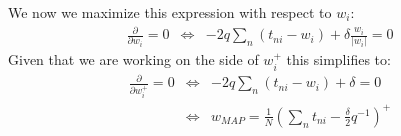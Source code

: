 \documentclass[a4paper, 11pt]{article}
\begin{document}
We now we maximize this expression with respect to $w_i$:
\begin{eqnarray}
\frac{\partial}{\partial w_{i}} = 0 &\Leftrightarrow& -2 q \sum_{n} (t_{ni} - w_{i}) + \delta \frac{w_i}{|w_i|} = 0 \nonumber
\end{eqnarray}
Given that we are working on the side of $w_{i}^{+}$ this simplifies to:
\begin{eqnarray}
\frac{\partial}{\partial w_{i}^{+}} = 0 &\Leftrightarrow& -2 q \sum_{n} (t_{ni} - w_{i}) + \delta = 0  \nonumber \\
&\Leftrightarrow&w_{MAP} = \frac{1}{N} \left( \sum_n t_{ni} - \frac{\delta}{2} q^{-1} \right)^+ \nonumber
\end{eqnarray}
\end{document}

